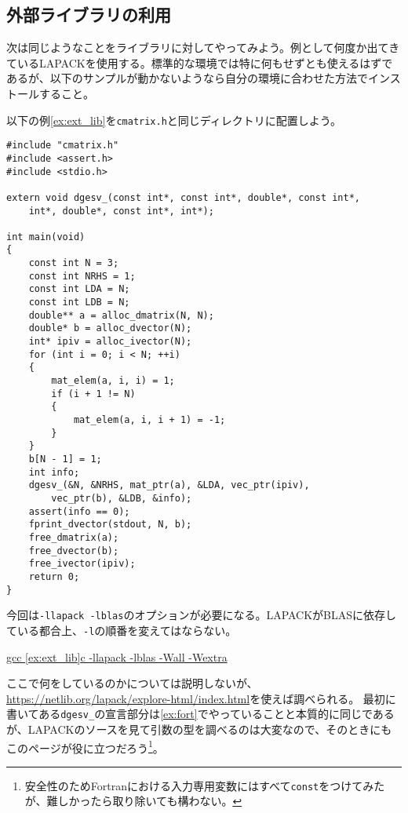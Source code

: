 \subsection{外部ライブラリの利用}
次は同じようなことをライブラリに対してやってみよう。例として何度か出てきているLAPACKを使用する。標準的な環境では特に何もせずとも使えるはずであるが、以下のサンプルが動かないようなら自分の環境に合わせた方法でインストールすること。

以下の例\ref{ex:ext_lib}を\texttt{cmatrix.h}と同じディレクトリに配置しよう。

\begin{reidai}\label{ex:ext_lib}
    \begin{verbatim}
#include "cmatrix.h"
#include <assert.h>
#include <stdio.h>

extern void dgesv_(const int*, const int*, double*, const int*,
    int*, double*, const int*, int*);

int main(void)
{
    const int N = 3;
    const int NRHS = 1;
    const int LDA = N;
    const int LDB = N;
    double** a = alloc_dmatrix(N, N);
    double* b = alloc_dvector(N);
    int* ipiv = alloc_ivector(N);
    for (int i = 0; i < N; ++i)
    {
        mat_elem(a, i, i) = 1;
        if (i + 1 != N)
        {
            mat_elem(a, i, i + 1) = -1;
        }
    }
    b[N - 1] = 1;
    int info;
    dgesv_(&N, &NRHS, mat_ptr(a), &LDA, vec_ptr(ipiv),
        vec_ptr(b), &LDB, &info);
    assert(info == 0);
    fprint_dvector(stdout, N, b);
    free_dmatrix(a);
    free_dvector(b);
    free_ivector(ipiv);
    return 0;
}
\end{verbatim}
\end{reidai}
今回は\texttt{-llapack -lblas}のオプションが必要になる。LAPACKがBLASに依存している都合上、\texttt{-l}の順番を変えてはならない。

\begin{commandline2}
    \prompt \underline{gcc \ref{ex:ext_lib}c -llapack -lblas -Wall -Wextra}
\end{commandline2} \noindent

ここで何をしているのかについては説明しないが、\url{https://netlib.org/lapack/explore-html/index.html}を使えば調べられる。
最初に書いてある\texttt{dgesv\_}の宣言部分は\ref{ex:fort}でやっていることと本質的に同じであるが、LAPACKのソースを見て引数の型を調べるのは大変なので、そのときにもこのページが役に立つだろう\footnote{安全性のためFortranにおける入力専用変数にはすべて\texttt{const}をつけてみたが、難しかったら取り除いても構わない。}。

